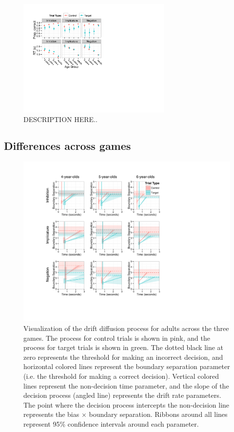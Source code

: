 \documentclass[10pt,letterpaper]{article}
\begin{document}
\begin{figure}
\begin{center} 
\includegraphics[width=3in]{figures/correct_RT.pdf}
\caption{\label{fig:traditional} DESCRIPTION HERE..}
\end{center} 
\end{figure}

\subsection{Differences across games}

\begin{figure}
\begin{center} 
\includegraphics[width=6in]{figures/adult_vis.pdf}
\caption{\label{fig:adults} Visualization of the drift diffusion process for adults across the three games.  The process for control trials is shown in pink, and the process for target trials is shown in green.  The dotted black line at zero represents the threshold for making an incorrect decision, and horizontal colored lines represent the boundary separation parameter (i.e. the threshold for making a correct decision).  Vertical colored lines represent the non-decision time parameter, and the slope of the decision process (angled line) represents the drift rate parameters.  The point where the decision process intercepts the non-decision line represents the bias $\times$ boundary separation.  Ribbons around all lines represent 95\% confidence intervals around each parameter.}
\end{center} 
\end{figure}
\end{document}
